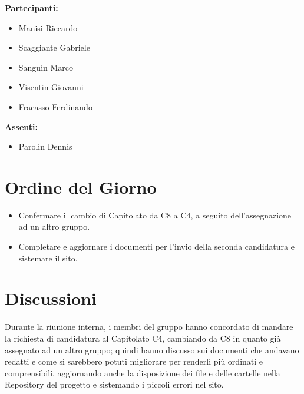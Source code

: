 \documentclass[a4paper,12pt]{article}
\begin{document}
	\vspace{0.4cm}
	\textbf{Partecipanti:}
	\begin{itemize}
		\item Manisi Riccardo
		\item Scaggiante Gabriele
		\item Sanguin Marco
		\item Visentin Giovanni
		\item Fracasso Ferdinando
	\end{itemize}
	
	\textbf{Assenti:}
	\begin{itemize}
		\item Parolin Dennis
	\end{itemize}
	
	\clearpage
	
	\vspace{0.5cm}
	
	\vspace{0.8cm}
	
	\clearpage
	\tableofcontents
	\thispagestyle{empty} %
	\clearpage
	
	\section{Ordine del Giorno}
	\begin{itemize}
		\item Confermare il cambio di Capitolato da C8 a C4, a seguito dell'assegnazione ad un altro gruppo.
		\item Completare e aggiornare i documenti per l'invio della seconda candidatura e sistemare il sito.
	\end{itemize}
	
	\section{Discussioni}
	Durante la riunione interna, i membri del gruppo hanno concordato di mandare la richiesta di candidatura al Capitolato C4, cambiando da C8 in quanto gi\`a assegnato ad un altro gruppo; quindi hanno discusso sui documenti che andavano redatti e come si sarebbero potuti migliorare per renderli pi\`u ordinati e comprensibili, aggiornando anche la disposizione dei file e delle cartelle nella Repository del progetto e sistemando i piccoli errori nel sito.
	
\end{document}
